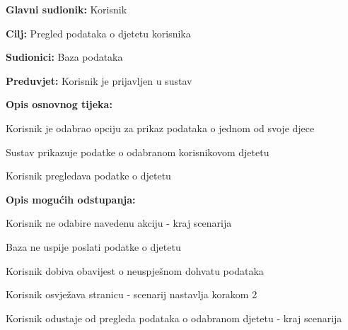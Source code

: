 					\noindent {}
					\begin{packed_item}
	
						\item \textbf{Glavni sudionik: }Korisnik
						\item  \textbf{Cilj:} Pregled podataka o djetetu korisnika
						\item  \textbf{Sudionici:} Baza podataka
						\item  \textbf{Preduvjet:} Korisnik je prijavljen u sustav
						\eject
						\item  \textbf{Opis osnovnog tijeka:}
						
						\item[] \begin{packed_enum}
							\item Korisnik je odabrao opciju za prikaz podataka o jednom od svoje djece
							\item Sustav prikazuje podatke o odabranom korisnikovom djetetu
							\item Korisnik pregledava podatke o djetetu
						\end{packed_enum}
						\item  \textbf{Opis mogućih odstupanja:}

						\item[] \begin{packed_item}
							\item[1.a] Korisnik ne odabire navedenu akciju - kraj scenarija
							\item[2.a] Baza ne uspije poslati podatke o djetetu
							\item[] \begin{packed_enum}	
								\item Korisnik dobiva obavijest o neuspješnom dohvatu podataka
								\item
									\begin{packed_enum}
										\item Korisnik osvježava stranicu - scenarij nastavlja korakom 2
										\item Korisnik odustaje od pregleda podataka o odabranom djetetu - kraj scenarija
									\end{packed_enum}	
							\end{packed_enum}	
						\end{packed_item}	
					\end{packed_item}


